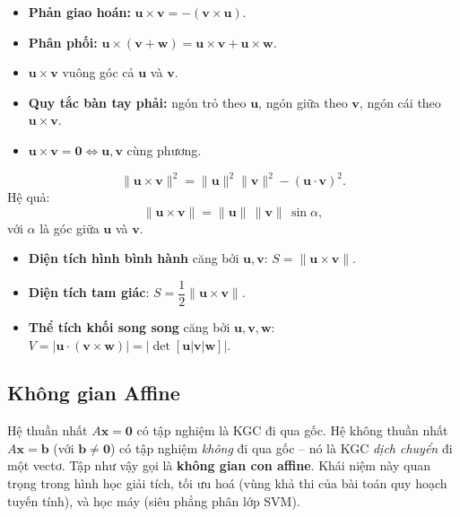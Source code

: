 \documentclass[12pt,a4paper]{article}
\begin{document}
\begin{tinhchat}[title={Tính chất tích chéo}]
\begin{itemize}
  \item \textbf{Phản giao hoán:} $\mathbf{u} \times \mathbf{v} = -(\mathbf{v} \times \mathbf{u})$.
  \item \textbf{Phân phối:} $\mathbf{u} \times (\mathbf{v} + \mathbf{w}) = \mathbf{u} \times \mathbf{v} + \mathbf{u} \times \mathbf{w}$.
  \item $\mathbf{u} \times \mathbf{v}$ vuông góc cả $\mathbf{u}$ và $\mathbf{v}$.
  \item \textbf{Quy tắc bàn tay phải:} ngón trỏ theo $\mathbf{u}$, ngón giữa theo $\mathbf{v}$, ngón cái theo $\mathbf{u} \times \mathbf{v}$.
  \item $\mathbf{u} \times \mathbf{v} = \mathbf{0} \Leftrightarrow \mathbf{u}, \mathbf{v}$ cùng phương.
\end{itemize}
\end{tinhchat}

\begin{dinhly}[title={Định lý Lagrange -- liên hệ tích vô hướng và tích chéo}]
\[
  \|\mathbf{u} \times \mathbf{v}\|^2 = \|\mathbf{u}\|^2 \|\mathbf{v}\|^2 - (\mathbf{u}\cdot \mathbf{v})^2.
\]
Hệ quả:
\[
  \|\mathbf{u} \times \mathbf{v}\| = \|\mathbf{u}\|\,\|\mathbf{v}\|\, \sin\alpha,
\]
với $\alpha$ là góc giữa $\mathbf{u}$ và $\mathbf{v}$.
\end{dinhly}

\begin{ungdung}
\begin{itemize}
  \item \textbf{Diện tích hình bình hành} căng bởi $\mathbf{u}, \mathbf{v}$: $S = \|\mathbf{u} \times \mathbf{v}\|$.
  \item \textbf{Diện tích tam giác}: $S = \dfrac{1}{2}\|\mathbf{u} \times \mathbf{v}\|$.
  \item \textbf{Thể tích khối song song} căng bởi $\mathbf{u}, \mathbf{v}, \mathbf{w}$: $V = |\mathbf{u} \cdot (\mathbf{v} \times \mathbf{w})| = |\det[\mathbf{u}|\mathbf{v}|\mathbf{w}]|$.
\end{itemize}
\end{ungdung}

\subsection{Không gian Affine}

\begin{dongco}
Hệ thuần nhất $A\mathbf{x} = \mathbf{0}$ có tập nghiệm là KGC đi qua gốc. Hệ không thuần nhất $A\mathbf{x} = \mathbf{b}$ (với $\mathbf{b} \ne \mathbf{0}$) có tập nghiệm \emph{không} đi qua gốc -- nó là KGC \emph{dịch chuyển} đi một vectơ. Tập như vậy gọi là \textbf{không gian con affine}. Khái niệm này quan trọng trong hình học giải tích, tối ưu hoá (vùng khả thi của bài toán quy hoạch tuyến tính), và học máy (siêu phẳng phân lớp SVM).
\end{dongco}
\end{document}
